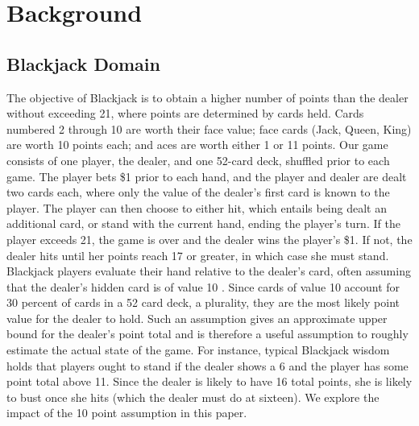 
\section{Background}
\label{sec:background}

\subsection{Blackjack Domain}

The objective of Blackjack is to obtain a higher number of points than the dealer without exceeding 21, where points are determined by cards held. Cards numbered 2 through 10 are worth their face value; face cards (Jack, Queen, King) are worth 10 points each; and aces are worth either 1 or 11 points. Our game consists of one player, the dealer, and one 52-card deck, shuffled prior to each game. The player bets \$1 prior to each hand, and the player and dealer are dealt two cards each, where only the value of the dealer's first card is known to the player. The player can then choose to either hit, which entails being dealt an additional card, or stand with the current hand, ending the player's turn. If the player exceeds 21, the game is over and the dealer wins the player's \$1. If not, the dealer hits until her points reach 17 or greater, in which case she must stand. \\

\noindent Blackjack players evaluate their hand relative to the dealer's card, often assuming that the dealer's hidden card is of value 10 \cite{b}. Since cards of value 10 account for 30 percent of cards in a 52 card deck, a plurality, they are the most likely point value for the dealer to hold. Such an assumption gives an approximate upper bound for the dealer's point total and is therefore a useful assumption to roughly estimate the actual state of the game. For instance, typical Blackjack wisdom holds that players ought to stand if the dealer shows a 6 and the player has some point total above 11. Since the dealer is likely to have 16 total points, she is likely to bust once she hits (which the dealer must do at sixteen). We explore the impact of the 10 point assumption in this paper. 




